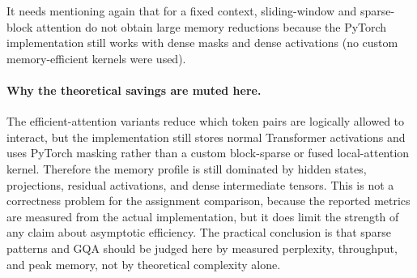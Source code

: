 \documentclass[11pt]{article}
\begin{document}
\begin{table}[H]
\centering
\small
\caption{Attention efficiency and stability metrics.}
\label{tab:attention-efficiency}
\end{table}

It needs mentioning again that for a fixed context, sliding-window and sparse-block attention do not obtain large memory reductions because the PyTorch implementation still works with dense masks and dense activations  (no custom memory-efficient kernels were used).

\paragraph{Why the theoretical savings are muted here.}
The efficient-attention variants reduce which token pairs are logically allowed to interact, but the implementation still stores normal Transformer activations and uses PyTorch masking rather than a custom block-sparse or fused local-attention kernel. Therefore the memory profile is still dominated by hidden states, projections, residual activations, and dense intermediate tensors. This is not a correctness problem for the assignment comparison, because the reported metrics are measured from the actual implementation, but it does limit the strength of any claim about asymptotic efficiency. The practical conclusion is that sparse patterns and GQA should be judged here by measured perplexity, throughput, and peak memory, not by theoretical complexity alone.
\end{document}
